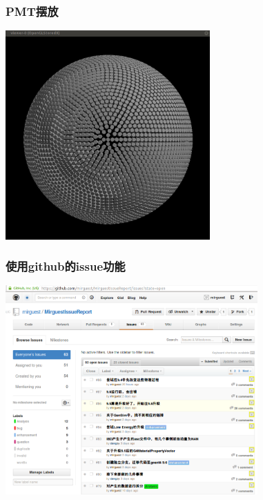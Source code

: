 \begin{frame}
    \frametitle{PMT摆放}
    \includegraphics[height=8cm,keepaspectratio]{data/pmts_in_ball.png}
\end{frame}

\begin{frame}
    \frametitle{使用github的issue功能}
        \includegraphics[height=8cm,keepaspectratio]{data/github_issue_own.png}
\end{frame}


